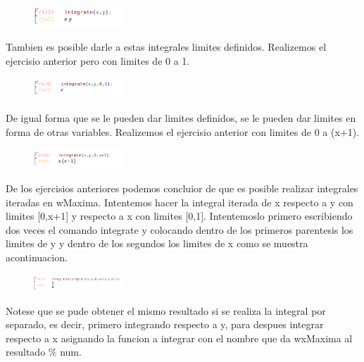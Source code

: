\documentclass[a4paper]{article}
\begin{document}
\begin{figure}[ht!]
\centering
\includegraphics[width=0.3\textwidth]{5.png}
\caption{\label{fig:}}
\end{figure}
 Tambien es posible darle a estas integrales limites definidos. Realizemos el ejercisio anterior pero con limites de 0 a 1.
\newpage
 

\begin{figure}[ht!]
\centering
\includegraphics[width=0.3\textwidth]{6.png}
\caption{\label{fig:}}
\end{figure} 

De igual forma que se le pueden dar limites definidos, se le pueden dar limites en forma de otras variables. Realizemos el ejercisio anterior con limites de 0 a (x+1).


\begin{figure}[ht!]
\centering
\includegraphics[width=0.3\textwidth]{7.png}
\caption{\label{fig:}}
\end{figure}

De los ejercisios anteriores podemos concluior de que es posible realizar integrales iteradas en wMaxima. Intentemos hacer la integral iterada de x respecto a y con limites [0,x+1] y respecto a x con limites [0,1]. Intentemoslo primero escribiendo dos veces el comando integrate y colocando dentro de los primeros parentesis los limites de y y dentro de los segundos los limites de x como se muestra acontinuacion. 

\begin{figure}[ht!]
\centering
\includegraphics[width=0.3\textwidth]{8.png}
\caption{\label{fig:}}
\end{figure}

Notese que se pude obtener el mismo resultado si se realiza la integral por separado, es decir, primero integrando respecto a y, para despues integrar respecto a x asignando la funcion a integrar con el nombre que da wxMaxima al resultado $\%$ num.
\end{document}
